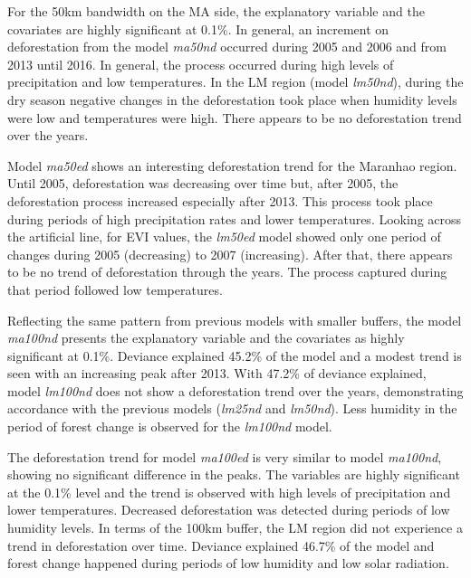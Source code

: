For the 50km bandwidth on the MA side, the explanatory variable and the covariates are highly significant at 0.1\%. In general, an increment on deforestation from the model \textit{ma50nd} occurred during 2005 and 2006 and from 2013 until 2016. In general, the process occurred during high levels of precipitation and low temperatures. In the LM region (model \textit{lm50nd}), during the dry season negative changes in the deforestation  took place when humidity levels were low and temperatures were high. There appears to be no deforestation trend over the years.  

Model \textit{ma50ed} shows an interesting deforestation trend for the Maranhao region. Until 2005, deforestation was decreasing over time but, after 2005, the deforestation process increased especially after 2013. This process took place during periods of high precipitation rates and lower temperatures. Looking across the artificial line, for EVI values, the \textit{lm50ed} model showed only one period of changes during 2005 (decreasing) to 2007 (increasing). After that, there appears to be no trend of deforestation through the years. The process captured during that period followed low temperatures.  

Reflecting the same pattern from previous models with smaller buffers, the model \textit{ma100nd} presents the explanatory variable and the covariates as highly significant at 0.1\%. Deviance explained 45.2\% of the model and a modest trend is seen with an increasing peak after 2013. With 47.2\% of deviance explained, model \textit{lm100nd} does not show a deforestation trend over the years, demonstrating accordance with the previous models (\textit{lm25nd} and \textit{lm50nd}). Less humidity in the period of forest change is observed for the \textit{lm100nd} model. 

The deforestation trend for model \textit{ma100ed} is very similar to model \textit{ma100nd}, showing no significant difference in the peaks. The variables are highly significant at the 0.1\% level and the trend is observed with high levels of precipitation and lower temperatures. Decreased deforestation was detected during periods of low humidity levels. In terms of the 100km buffer, the LM region did not experience a trend in deforestation over time. Deviance explained 46.7\% of the model and forest change happened during periods of low humidity and low solar radiation.

